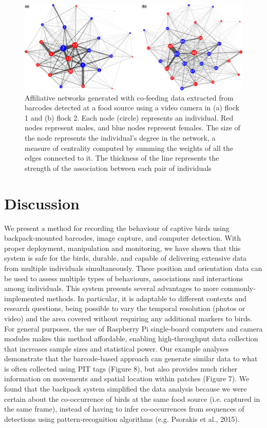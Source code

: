 \documentclass[11pt,a4paper,oneside]{book}
\begin{document}
\begin{figure}[!htb]
    \centering
    \includegraphics{Graving_IMPRS_Thesis/figures/bird_figure_8.jpg}
    \caption{Affiliative networks generated with co‐feeding data extracted from barcodes detected at a food source using a video camera in (a) flock 1 and (b) flock 2. Each node (circle) represents an individual. Red nodes represent males, and blue nodes represent females. The size of the node represents the individual's degree in the network, a measure of centrality computed by summing the weights of all the edges connected to it. The thickness of the line represents the strength of the association between each pair of individuals
}
    \label{fig:bird_figure_8}
\end{figure}

\section{Discussion}
We present a method for recording the behaviour of captive birds using backpack‐mounted barcodes, image capture, and computer detection. With proper deployment, manipulation and monitoring, we have shown that this system is safe for the birds, durable, and capable of delivering extensive data from multiple individuals simultaneously. These position and orientation data can be used to assess multiple types of behaviours, associations and interactions among individuals. This system presents several advantages to more commonly‐implemented methods. In particular, it is adaptable to different contexts and research questions, being possible to vary the temporal resolution (photos or video) and the area covered without requiring any additional markers to birds. For general purposes, the use of Raspberry Pi single‐board computers and camera modules makes this method affordable, enabling high‐throughput data collection that increases sample sizes and statistical power. Our example analyses demonstrate that the barcode‐based approach can generate similar data to what is often collected using PIT tags (Figure 8), but also provides much richer information on movements and spatial location within patches (Figure 7). We found that the backpack system simplified the data analysis because we were certain about the co‐occurrence of birds at the same food source (i.e. captured in the same frame), instead of having to infer co‐occurrences from sequences of detections using pattern‐recognition algorithms (e.g. Psorakis et al., 2015).
\end{document}
